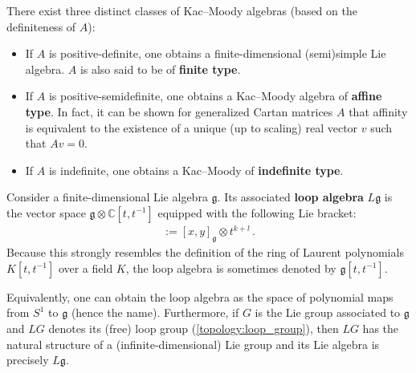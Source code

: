     \begin{remark}[Classification]
        There exist three distinct classes of Kac--Moody algebras (based on the definiteness of $A$):
        \begin{itemize}
            \item If $A$ is positive-definite, one obtains a finite-dimensional (semi)simple Lie algebra. $A$ is also said to be of \textbf{finite type}.
            \item If $A$ is positive-semidefinite, one obtains a Kac--Moody algebra of \textbf{affine type}. In fact, it can be shown for generalized Cartan matrices $A$ that affinity is equivalent to the existence of a unique (up to scaling) real vector $v$ such that $Av=0$.
            \item If $A$ is indefinite, one obtains a Kac--Moody of \textbf{indefinite type}.
        \end{itemize}
    \end{remark}

    \begin{definition}
        Consider a finite-dimensional Lie algebra $\mathfrak{g}$. Its associated \textbf{loop algebra} $L\mathfrak{g}$ is the vector space $\mathfrak{g}\otimes\mathbb{C}[t,t^{-1}]$ equipped with the following Lie bracket:
        \begin{gather}
            [x\otimes t^k,y\otimes t^l] := [x,y]_{\mathfrak{g}}\otimes t^{k+l}\,.
        \end{gather}
        Because this strongly resembles the definition of the ring of Laurent polynomials $K[t,t^{-1}]$ over a field $K$, the loop algebra is sometimes denoted by $\mathfrak{g}[t,t^{-1}]$.

        Equivalently, one can obtain the loop algebra as the space of polynomial maps from $S^1$ to $\mathfrak{g}$ (hence the name). Furthermore, if $G$ is the Lie group associated to $\mathfrak{g}$ and $LG$ denotes its (free) loop group (\cref{topology:loop_group}), then $LG$ has the natural structure of a (infinite-dimensional) Lie group and its Lie algebra is precisely $L\mathfrak{g}$.
    \end{definition}

